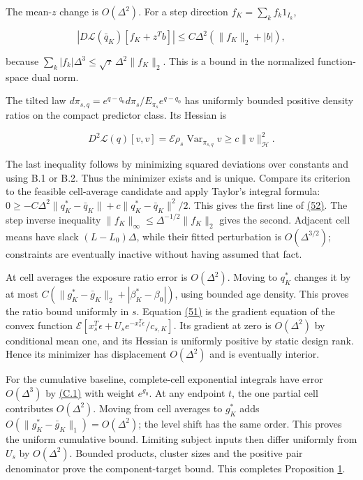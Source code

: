\documentclass[11pt]{article}
\begin{document}
The mean-\(z\) change is \(O(\Delta^2)\). For a step direction \(f_K=\sum_kf_k1_{I_k}\),

\begin{equation*}
|D\mathcal L(\bar q_K)[f_K+z^Tb]|
\leq C\Delta^2(\|f_K\|_2+|b|),
\tag{C.3}\label{eq:C.3}
\end{equation*}

because \(\sum_k|f_k|\Delta^3\leq\sqrt\tau\,\Delta^2\|f_K\|_2\).
This is a bound in the normalized function-space dual norm.

The tilted law \(d\pi_{s,q}=e^{q-q_0}d\pi_s/E_{\pi_s}e^{q-q_0}\) has uniformly bounded positive density ratios on the compact predictor class. Its Hessian is

\begin{equation*}
D^2\mathcal L(q)[v,v]=\mathcal E\rho_s\operatorname{Var}_{\pi_{s,q}}v
\geq c\|v\|_{\mathcal H}^2.
\tag{C.4}\label{eq:C.4}
\end{equation*}

The last inequality follows by minimizing squared deviations over constants and using B.1 or B.2. Thus the minimizer exists and is unique. Compare its criterion to the feasible cell-average candidate and apply Taylor's integral formula:
\(0\geq-C\Delta^2\|q_K^*-\bar q_K\|+
c\|q_K^*-\bar q_K\|^2/2\).
This gives the first line of \hyperref[eq:52]{(52)}. The step inverse inequality
\(\|f_K\|_\infty\leq\Delta^{-1/2}\|f_K\|_2\) gives the second. Adjacent cell means have slack \((L-L_0)\Delta\), while their fitted perturbation is \(O(\Delta^{3/2})\); constraints are eventually inactive without having assumed that fact.

At cell averages the exposure ratio error is \(O(\Delta^2)\). Moving to \(q_K^*\) changes it by at most
\(C(\|g_K^*-\bar g_K\|_2+|\beta_K^*-\beta_0|)\), using bounded age density. This proves the ratio bound uniformly in \(s\). Equation \hyperref[eq:51]{(51)} is the gradient equation of the convex function
\(\mathcal E[x_s^T\epsilon+U_s e^{-x_s^T\epsilon}/c_{s,K}]\).
Its gradient at zero is \(O(\Delta^2)\) by conditional mean one, and its Hessian is uniformly positive by static design rank. Hence its minimizer has displacement \(O(\Delta^2)\) and is eventually interior.

For the cumulative baseline, complete-cell exponential integrals have error \(O(\Delta^3)\) by \hyperref[eq:C.1]{(C.1)} with weight \(e^{g_0}\). At any endpoint \(t\), the one partial cell contributes \(O(\Delta^2)\). Moving from cell averages to \(g_K^*\) adds \(O(\|g_K^*-\bar g_K\|_1)=O(\Delta^2)\); the level shift has the same order. This proves the uniform cumulative bound. Limiting subject inputs then differ uniformly from \(U_s\) by \(O(\Delta^2)\). Bounded products, cluster sizes and the positive pair denominator prove the component-target bound. This completes Proposition \hyperref[res:Proposition-1]{1}.
\end{document}
